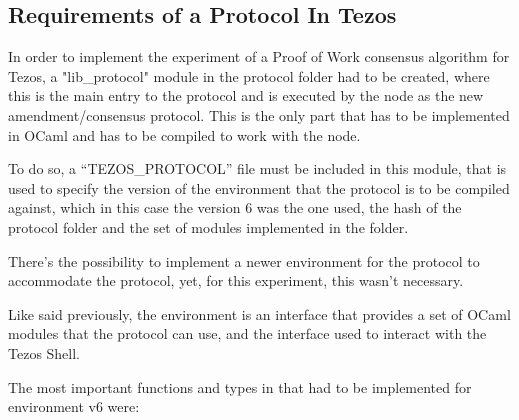\subsection*{Requirements of a Protocol In Tezos}
In order to implement the experiment of a Proof of Work consensus algorithm for Tezos, a "lib\_protocol" module in the protocol folder had to be created, where this is the main entry to the protocol and is executed by the node as the new amendment/consensus protocol. This is the only part that has to be implemented in OCaml and has to be compiled to work with the node.

To do so, a ``TEZOS\_PROTOCOL'' file must be included in this module, that is used to specify the version of the environment that the protocol is to be compiled against, which in this case the version 6 was the one used, the hash of the protocol folder and the set of modules implemented in the folder. 

There's the possibility to implement a newer environment for the protocol to accommodate the protocol, yet, for this experiment, this wasn't necessary. 

Like said previously, the environment is an interface that provides a set of OCaml modules that the protocol can use, and the interface used to interact with the Tezos Shell.

The most important functions and types in that had to be implemented for environment v6 were:

